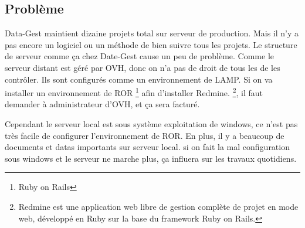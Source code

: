 \subsection{Problème}
Data-Gest maintient dizaine projets total sur serveur de production. Mais il n'y a pas encore un logiciel ou un méthode de bien suivre tous les projets.   
Le structure de serveur comme ça chez Date-Gest cause un peu de problème. Comme le serveur distant est géré par OVH, donc on n'a pas de droit de tous les de les contrôler. Ils sont configurés comme un environnement de LAMP. Si on va installer un environnement de ROR \footnote{Ruby on Rails} afin d'installer Redmine.  \footnote{Redmine est une application web libre de gestion complète de projet en mode web, développé en Ruby sur la base du framework Ruby on Rails.}, il faut demander à administrateur d'OVH, et ça sera facturé.

Cependant le serveur local est sous système exploitation de windows, ce n'est pas très facile de configurer l'environnement de ROR. En plus, il y a beaucoup de documents et datas importants sur serveur local. si on fait la mal configuration sous windows et le serveur ne marche plus, ça influera sur les travaux quotidiens.

 


